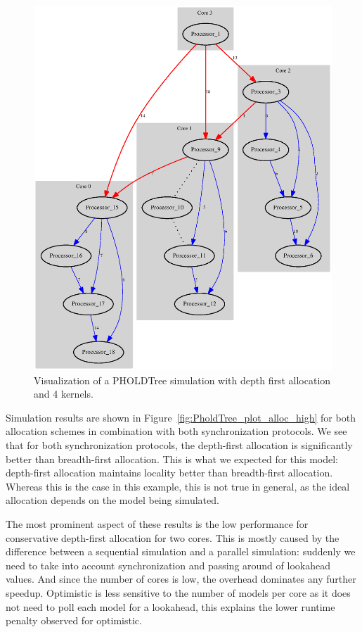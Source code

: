 \begin{figure}
    \center
    \includegraphics[width=\columnwidth]{fig/pholdtreed1n3t5000c4DFS.eps}
    \caption{Visualization of a PHOLDTree simulation with depth first allocation and 4 kernels.}
    \label{fig:pholdtree_visualize_parDFS}
\end{figure}

Simulation results are shown in Figure~\ref{fig:PholdTree_plot_alloc_high} for both allocation schemes in combination with both synchronization protocols.
We see that for both synchronization protocols, the depth-first allocation is significantly better than breadth-first allocation.
This is what we expected for this model: depth-first allocation maintains locality better than breadth-first allocation.
Whereas this is the case in this example, this is not true in general, as the ideal allocation depends on the model being simulated.

The most prominent aspect of these results is the low performance for conservative depth-first allocation for two cores.
This is mostly caused by the difference between a sequential simulation and a parallel simulation: suddenly we need to take into account synchronization and passing around of lookahead values.
And since the number of cores is low, the overhead dominates any further speedup.
Optimistic is less sensitive to the number of models per core as it does not need to poll each model for a lookahead, this explains the lower runtime penalty observed for optimistic.

